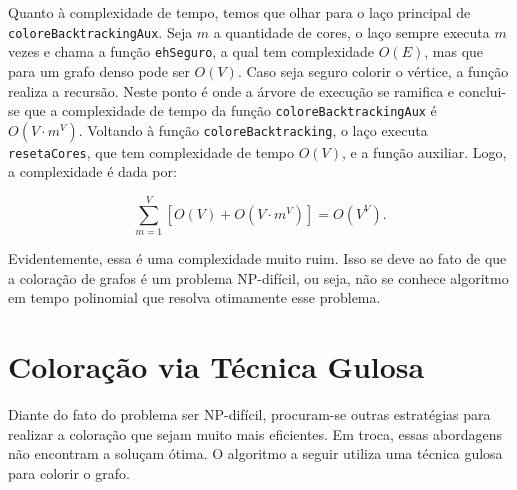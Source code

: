 \documentclass{article}
\begin{document}
Quanto à complexidade de tempo, temos que olhar para o laço principal de \texttt{coloreBacktrackingAux}. Seja $m$ a quantidade de cores, o laço sempre executa $m$ vezes e chama a função \texttt{ehSeguro}, a qual tem complexidade $O(E)$, mas que para um grafo denso pode ser $O(V)$. Caso seja seguro colorir o vértice, a função realiza a recursão. Neste ponto é onde a árvore de execução se ramifica e conclui-se que a complexidade de tempo da função \texttt{coloreBacktrackingAux} é $O(V\cdot m^V)$. Voltando à função \texttt{coloreBacktracking}, o laço executa \texttt{resetaCores}, que tem complexidade de tempo $O(V)$, e a função auxiliar. Logo, a complexidade é dada por:

\[\sum_{m=1}^{V} [O(V) + O(V\cdot m^V)] = O(V^V).\]

Evidentemente, essa é uma complexidade muito ruim. Isso se deve ao fato de que a coloração de grafos é um problema NP-difícil, ou seja, não se conhece algoritmo em tempo polinomial que resolva otimamente esse problema.

\section{Coloração via Técnica Gulosa}

Diante do fato do problema ser NP-difícil, procuram-se outras estratégias para realizar a coloração que sejam muito mais eficientes. Em troca, essas abordagens não encontram a soluçam ótima. O algoritmo a seguir utiliza uma técnica gulosa para colorir o grafo.
\end{document}
